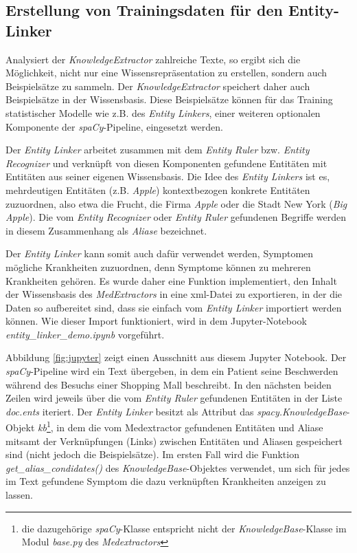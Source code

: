 \subsection{Erstellung von Trainingsdaten für den Entity-Linker}

Analysiert der \emph{KnowledgeExtractor} zahlreiche Texte, so ergibt sich die Möglichkeit, nicht nur eine Wissensrepräsentation zu erstellen, sondern auch Beispielsätze zu sammeln. Der \emph{KnowledgeExtractor} speichert daher auch Beispielsätze in der Wissensbasis. Diese Beispielsätze können für das Training statistischer Modelle wie z.B. des \emph{Entity Linkers}, einer weiteren optionalen Komponente der \emph{spaCy}-Pipeline, eingesetzt werden.

Der \emph{Entity Linker} arbeitet zusammen mit dem \emph{Entity Ruler} bzw. \emph{Entity Recognizer} und verknüpft von diesen Komponenten gefundene Entitäten mit Entitäten aus seiner eigenen Wissensbasis. Die Idee des \emph{Entity Linkers} ist es, mehrdeutigen Entitäten (z.B. \emph{Apple}) kontextbezogen konkrete Entitäten zuzuordnen, also etwa die Frucht, die Firma \emph{Apple} oder die Stadt New York (\emph{Big Apple}). Die vom \emph{Entity Recognizer} oder \emph{Entity Ruler} gefundenen Begriffe werden in diesem Zusammenhang als \emph{Aliase} bezeichnet.

Der \emph{Entity Linker} kann somit auch dafür verwendet werden, Symptomen mögliche Krankheiten zuzuordnen, denn Symptome können zu mehreren Krankheiten gehören. Es wurde daher eine Funktion implementiert, den Inhalt der Wissensbasis des \emph{MedExtractors} in eine xml-Datei zu exportieren, in der die Daten so aufbereitet sind, dass sie einfach vom \emph{Entity Linker} importiert werden können. Wie dieser Import funktioniert, wird in dem Jupyter-Notebook \emph{entity\_linker\_demo.ipynb} vorgeführt.

Abbildung \ref{fig:jupyter} zeigt einen Ausschnitt aus diesem Jupyter Notebook. Der \emph{spaCy}-Pipeline wird ein Text übergeben, in dem ein Patient seine Beschwerden während des Besuchs einer Shopping Mall beschreibt. In den nächsten beiden Zeilen wird jeweils über die vom \emph{Entity Ruler} gefundenen Entitäten in der Liste \emph{doc.ents} iteriert. Der \emph{Entity Linker} besitzt als Attribut das \emph{spacy.KnowledgeBase}-Objekt \emph{kb}\footnote{die dazugehörige \emph{spaCy}-Klasse entspricht nicht der \emph{KnowledgeBase}-Klasse im Modul \emph{base.py} des \emph{Medextractors}}, in dem die vom Medextractor gefundenen Entitäten und Aliase mitsamt der Verknüpfungen (Links) zwischen Entitäten und Aliasen gespeichert sind (nicht jedoch die Beispielsätze). Im ersten Fall wird die Funktion \emph{get\_alias\_condidates()} des \emph{KnowledgeBase}-Objektes verwendet, um sich für jedes im Text gefundene Symptom die dazu verknüpften Krankheiten anzeigen zu lassen.

